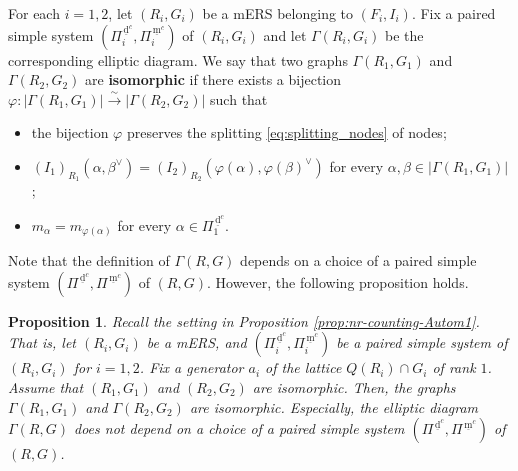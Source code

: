 \documentclass[11pt]{amsart}
\newcommand{\dc}{\,\underline{\mathrm{d}}^c}
\newcommand{\mc}{\, \underline{\mathrm{m}}^c}
\newtheorem{prop}[thm]{Proposition}%
\newtheorem{rem}[thm]{Remark}%
\begin{document}
{For each $i=1,2$, let $(R_i,G_i)$ be a mERS belonging to $(F_i,I_i)$. 
Fix a paired simple system $(\Pi^{\dc}_i,\Pi^{\mc}_i)$ of $(R_i,G_i)$ and let 
$\Gamma(R_i,G_i)$ be the corresponding elliptic diagram. We say 
that two graphs $\Gamma(R_1,G_1)$ and $\Gamma(R_2,G_2)$ are \textbf{isomorphic} 
if there exists a 
bijection $\varphi:|\Gamma(R_1,G_1)|\xrightarrow{\sim} |\Gamma(R_2,G_2)|$
such that
\begin{itemize}
\item[(i)] the bijection $\varphi$ preserves the splitting \eqref{eq:splitting_nodes}
of nodes;
\vskip 1mm
\item[(ii)] $(I_1)_{R_1}(\alpha,\beta^\vee)
=(I_2)_{R_2}(\varphi(\alpha),\varphi(\beta)^\vee)$ for every 
$\alpha,\beta\in |\Gamma(R_1,G_1)|$;
\vskip 1mm
\item[(iii)] $m_\alpha=m_{\varphi(\alpha)}$ for every $\alpha\in\Pi_1^{\dc}$. \\
\end{itemize}

Note that the definition of $\Gamma(R,G)$ depends on 
a choice of a paired simple system $(\Pi^{\dc},\Pi^{\mc})$ of $(R,G)$. 
However, the following proposition holds.

\begin{prop}\label{prop:indendence-Gamma}
Recall the setting in Proposition \ref{prop:nr-counting-Autom1}. That is, 
let $(R_i,G_i)$ be a mERS, and $(\Pi^{\dc}_i,\Pi^{\mc}_i)$ be a paired  
simple system of $(R_i,G_i)$ for $i=1,2$. Fix a generator $a_i$
of the lattice $Q(R_i)\cap G_i$ of rank $1$. Assume that $(R_1,G_1)$ and
$(R_2,G_2)$ are isomorphic. Then, the graphs
$\Gamma(R_1,G_1)$ and $\Gamma(R_2,G_2)$ are isomorphic. Especially, 
the elliptic diagram $\Gamma(R,G)$ does not depend on a choice of a paired
simple system $(\Pi^{\dc},\Pi^{\mc})$ of $(R,G)$.
\end{prop}

}
\end{document}
